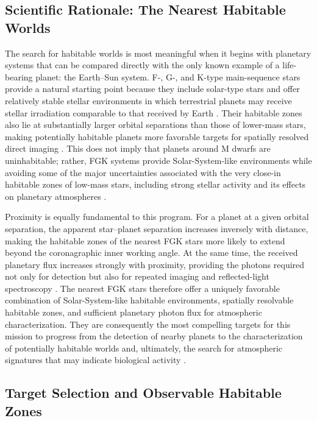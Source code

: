 \subsection{Scientific Rationale: The Nearest Habitable Worlds}
\label{sec:habitable-rationale}

The search for habitable worlds is most meaningful when it begins with planetary
systems that can be compared directly with the only known example of a life-bearing
planet: the Earth--Sun system. F-, G-, and K-type main-sequence stars provide a natural
starting point because they include solar-type stars and offer relatively stable stellar
environments in which terrestrial planets may receive stellar irradiation comparable to
that received by Earth \cite{Kopparapu13}. Their habitable zones also lie at
substantially larger orbital separations than those of lower-mass stars, making potentially
habitable planets more favorable targets for spatially resolved direct imaging
\cite{Kopparapu13,Tuchow2024}. This does not imply that planets around M dwarfs
are uninhabitable; rather, FGK systems provide Solar-System-like environments while
avoiding some of the major uncertainties associated with the very close-in habitable
zones of low-mass stars, including strong stellar activity and its effects on planetary
atmospheres \cite{Shields2016}.

Proximity is equally fundamental to this program. For a planet at a given orbital
separation, the apparent star--planet separation increases inversely with distance, making
the habitable zones of the nearest FGK stars more likely to extend beyond the
coronagraphic inner working angle. At the same time, the received planetary flux
increases strongly with proximity, providing the photons required not only for detection
but also for repeated imaging and reflected-light spectroscopy
\cite{Tuchow2024,Stark2019}. The nearest FGK stars therefore offer a uniquely favorable
combination of Solar-System-like habitable environments, spatially resolvable habitable
zones, and sufficient planetary photon flux for atmospheric characterization. They are
consequently the most compelling targets for this mission to progress from the detection
of nearby planets to the characterization of potentially habitable worlds and, ultimately,
the search for atmospheric signatures that may indicate biological activity
\cite{Schwieterman2018}.

\subsection{Target Selection and Observable Habitable Zones}
\label{sec:hz-target-selection}

